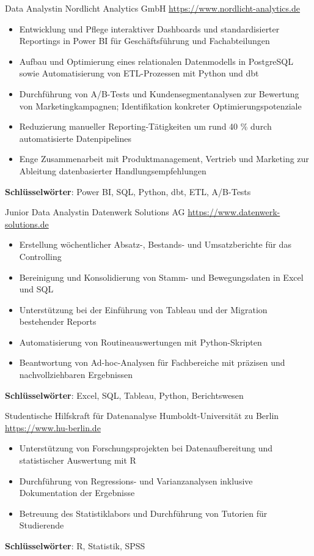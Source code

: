 \documentclass[a4paper, serif, 10pt]{moderncv}
\begin{document}
        {Data Analystin}
        {Nordlicht Analytics GmbH}
        {\url{https://www.nordlicht-analytics.de}}
        {}
        {\begin{itemize}
\item Entwicklung und Pflege interaktiver Dashboards und standardisierter Reportings in Power BI für Geschäftsführung und Fachabteilungen
\item Aufbau und Optimierung eines relationalen Datenmodells in PostgreSQL sowie Automatisierung von ETL-Prozessen mit Python und dbt
\item Durchführung von A/B-Tests und Kundensegmentanalysen zur Bewertung von Marketingkampagnen; Identifikation konkreter Optimierungspotenziale
\item Reduzierung manueller Reporting-Tätigkeiten um rund 40 \% durch automatisierte Datenpipelines
\item Enge Zusammenarbeit mit Produktmanagement, Vertrieb und Marketing zur Ableitung datenbasierter Handlungsempfehlungen
\end{itemize}
\textbf{Schlüsselwörter}: Power BI, SQL, Python, dbt, ETL, A/B-Tests}

        {Junior Data Analystin}
        {Datenwerk Solutions AG}
        {\url{https://www.datenwerk-solutions.de}}
        {}
        {\begin{itemize}
\item Erstellung wöchentlicher Absatz-, Bestands- und Umsatzberichte für das Controlling
\item Bereinigung und Konsolidierung von Stamm- und Bewegungsdaten in Excel und SQL
\item Unterstützung bei der Einführung von Tableau und der Migration bestehender Reports
\item Automatisierung von Routineauswertungen mit Python-Skripten
\item Beantwortung von Ad-hoc-Analysen für Fachbereiche mit präzisen und nachvollziehbaren Ergebnissen
\end{itemize}
\textbf{Schlüsselwörter}: Excel, SQL, Tableau, Python, Berichtswesen}

        {Studentische Hilfskraft für Datenanalyse}
        {Humboldt-Universität zu Berlin}
        {\url{https://www.hu-berlin.de}}
        {}
        {\begin{itemize}
\item Unterstützung von Forschungsprojekten bei Datenaufbereitung und statistischer Auswertung mit R
\item Durchführung von Regressions- und Varianzanalysen inklusive Dokumentation der Ergebnisse
\item Betreuung des Statistiklabors und Durchführung von Tutorien für Studierende
\end{itemize}
\textbf{Schlüsselwörter}: R, Statistik, SPSS}
\end{document}
